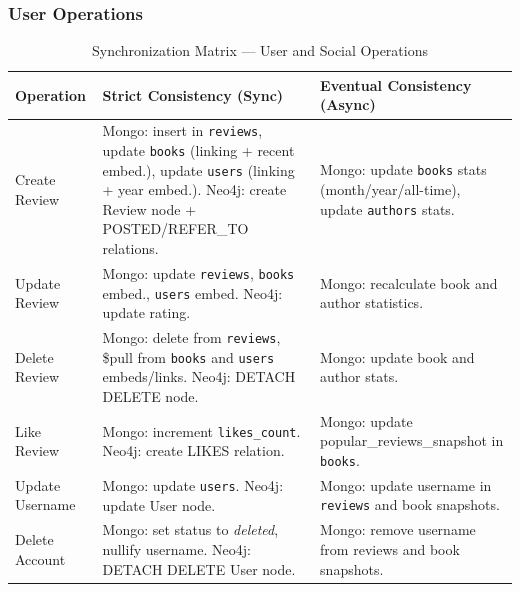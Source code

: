 \subsubsection{User Operations}
\begin{table}[H]
    \centering
    \caption{Synchronization Matrix --- User and Social Operations}
    \label{tab:sync_matrix_user}
    \renewcommand{\arraystretch}{1.4}
    \begin{tabular}{@{}p{}p{}p{}@{}}
        \toprule
        \textbf{Operation} & \textbf{Strict Consistency (Sync)} & \textbf{Eventual Consistency (Async)} \\ \midrule
        Create Review & Mongo: insert in \texttt{reviews}, update \texttt{books} (linking + recent embed.), update \texttt{users} (linking + year embed.). Neo4j: create Review node + POSTED/REFER\_TO relations. & Mongo: update \texttt{books} stats (month/year/all-time), update \texttt{authors} stats. \\
        Update Review & Mongo: update \texttt{reviews}, \texttt{books} embed., \texttt{users} embed. Neo4j: update rating. & Mongo: recalculate book and author statistics. \\
        Delete Review & Mongo: delete from \texttt{reviews}, \$pull from \texttt{books} and \texttt{users} embeds/links. Neo4j: DETACH DELETE node. & Mongo: update book and author stats. \\
        Like Review & Mongo: increment \texttt{likes\_count}. Neo4j: create LIKES relation. & Mongo: update popular\_reviews\_snapshot in \texttt{books}. \\
        Update Username & Mongo: update \texttt{users}. Neo4j: update User node. & Mongo: update username in \texttt{reviews} and book snapshots. \\
        Delete Account & Mongo: set status to \textit{deleted}, nullify username. Neo4j: DETACH DELETE User node. & Mongo: remove username from reviews and book snapshots. \\
        \bottomrule
    \end{tabular}
\end{table}

